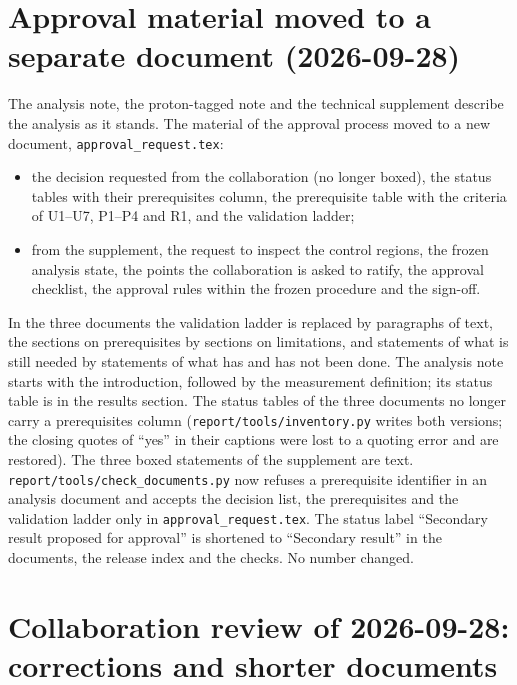 \section{Approval material moved to a separate document (2026-09-28)}

The analysis note, the proton-tagged note and the technical supplement describe the analysis as it
stands. The material of the approval process moved to a new document, \texttt{approval\_request.tex}:
\begin{itemize}\itemsep1pt
  \item the decision requested from the collaboration (no longer boxed), the status tables with their
    prerequisites column, the prerequisite table with the criteria of U1--U7, P1--P4 and R1, and the
    validation ladder;
  \item from the supplement, the request to inspect the control regions, the frozen analysis state, the
    points the collaboration is asked to ratify, the approval checklist, the approval rules within the
    frozen procedure and the sign-off.
\end{itemize}
In the three documents the validation ladder is replaced by paragraphs of text, the sections on
prerequisites by sections on limitations, and statements of what is still needed by statements of what
has and has not been done. The analysis note starts with the introduction, followed by the measurement
definition; its status table is in the results section. The status tables of the three documents no
longer carry a prerequisites column (\texttt{report/tools/inventory.py} writes both versions; the closing
quotes of ``yes'' in their captions were lost to a quoting error and are restored). The three boxed
statements of the supplement are text. \texttt{report/tools/check\_documents.py} now refuses a
prerequisite identifier in an analysis document and accepts the decision list, the prerequisites and
the validation ladder only in \texttt{approval\_request.tex}. The status label ``Secondary result
proposed for approval'' is shortened to ``Secondary result'' in the documents, the release index and the
checks. No number changed.

\section{Collaboration review of 2026-09-28: corrections and shorter documents}


